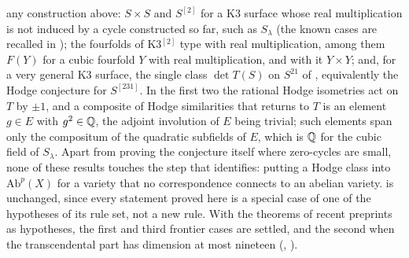 \begin{remark}
any construction above: $S\times S$ and $S^{[2]}$ for a K3 surface
whose real multiplication is not induced by a cycle constructed so far, such
as $S_{\lambda}$
(the known cases are recalled in ); the fourfolds of
K3$^{[2]}$ type with real multiplication, among them $F(Y)$ for a cubic
fourfold $Y$ with real multiplication, and with it $Y\times Y$; and, for a
very general K3 surface, the single class $\det T(S)$ on $S^{21}$ of
, equivalently the Hodge conjecture for $S^{[231]}$.
In the first two the
rational Hodge isometries \cite{Bus19,Mar24} act on $T$ by $\pm1$, and a
composite of Hodge similarities that returns to $T$ is an element $g\in E$
with $g^{2}\in\mathbb{Q}$, the adjoint involution of $E$ being trivial; such
elements span only the compositum of the quadratic subfields of $E$, which is
$\mathbb{Q}$ for the cubic field of $S_{\lambda}$. Apart from proving the
conjecture itself where zero-cycles are small, none of these results touches
the step that
 identifies: putting a Hodge class into
$\mathrm{Ab}^{p}(X)$ for a variety that no correspondence connects to an
abelian variety.  is unchanged, since every statement
proved here is a special case of one of the hypotheses of its rule set, not a
new rule. With the theorems of recent preprints as hypotheses, the first and
third frontier cases are settled, and the second when the transcendental part
has dimension at most nineteen (, ).
\end{remark}

